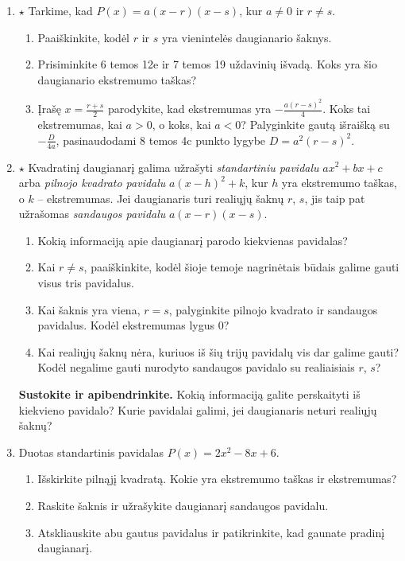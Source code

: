 \documentclass[12pt,a4paper]{article}
\begin{document}
\begin{enumerate}[series=uzdaviniai]
\begin{enumerate}
\end{enumerate}
\item $\star$ Tarkime, kad $P(x)=a(x-r)(x-s)$, kur $a\ne0$ ir $r\ne s$.
\begin{enumerate}
\item Paaiškinkite, kodėl $r$ ir $s$ yra vienintelės daugianario šaknys.
\item Prisiminkite 6 temos 12e ir 7 temos 19 uždavinių išvadą. Koks yra šio daugianario ekstremumo taškas?
\item Įrašę $x=\frac{r+s}{2}$ parodykite, kad ekstremumas yra $-\frac{a(r-s)^2}{4}$. Koks tai ekstremumas, kai $a>0$, o koks, kai $a<0$? Palyginkite gautą išraišką su $-\frac{D}{4a}$, pasinaudodami 8 temos 4c punkto lygybe $D=a^2(r-s)^2$.
\end{enumerate}
\item $\star$ Kvadratinį daugianarį galima užrašyti \emph{standartiniu pavidalu} $ax^2+bx+c$ arba \emph{pilnojo kvadrato pavidalu} $a(x-h)^2+k$, kur $h$ yra ekstremumo taškas, o $k$ – ekstremumas. Jei daugianaris turi realiųjų šaknų $r$, $s$, jis taip pat užrašomas \emph{sandaugos pavidalu} $a(x-r)(x-s)$.
\begin{enumerate}
\item Kokią informaciją apie daugianarį parodo kiekvienas pavidalas?
\item Kai $r\ne s$, paaiškinkite, kodėl šioje temoje nagrinėtais būdais galime gauti visus tris pavidalus.
\item Kai šaknis yra viena, $r=s$, palyginkite pilnojo kvadrato ir sandaugos pavidalus. Kodėl ekstremumas lygus $0$?
\item Kai realiųjų šaknų nėra, kuriuos iš šių trijų pavidalų vis dar galime gauti? Kodėl negalime gauti nurodyto sandaugos pavidalo su realiaisiais $r$, $s$?
\end{enumerate}
\par\medskip
\textbf{Sustokite ir apibendrinkite.} Kokią informaciją galite perskaityti iš kiekvieno pavidalo? Kurie pavidalai galimi, jei daugianaris neturi realiųjų šaknų?
\item Duotas standartinis pavidalas $P(x)=2x^2-8x+6$.
\begin{enumerate}
\item Išskirkite pilnąjį kvadratą. Kokie yra ekstremumo taškas ir ekstremumas?
\item Raskite šaknis ir užrašykite daugianarį sandaugos pavidalu.
\item Atskliauskite abu gautus pavidalus ir patikrinkite, kad gaunate pradinį daugianarį.

\end{enumerate}
\end{enumerate}
\end{document}
